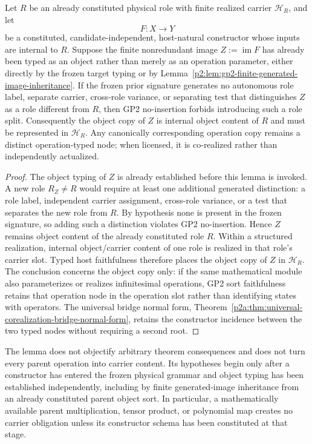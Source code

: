 \documentclass[12pt,a4paper]{article}
\begin{document}
\begin{lemma}
\label{p2:lem:gp2-same-role-no-splitting}
Let \(R\) be an already constituted physical role with finite realized carrier
\(\mathcal H_R\), and let
\[
 F:X\longrightarrow Y
\]
be a constituted, candidate-independent, host-natural constructor whose inputs
are internal to \(R\).  Suppose the finite nonredundant image \(Z:=\operatorname{im}F\) has
already been typed as an object rather than merely as an operation parameter,
either directly by the frozen target typing or by
Lemma~\ref{p2:lem:gp2-finite-generated-image-inheritance}.  If the frozen prior
signature generates no autonomous role label, separate carrier, cross-role
variance, or separating test that distinguishes \(Z\) as a role different
from \(R\), then GP2 no-insertion forbids introducing such a role split.
Consequently the object copy of \(Z\) is internal object content of \(R\) and
must be represented in \(\mathcal H_R\).  Any canonically corresponding
operation copy remains a distinct operation-typed node; when licensed, it is
co-realized rather than independently actualized.
\end{lemma}

\begin{proof}
The object typing of \(Z\) is already established before this lemma is
invoked.  A new role \(R_Z\neq R\) would require at least one additional
generated distinction:
a role label, independent carrier assignment, cross-role variance, or a test
that separates the new role from \(R\).  By hypothesis none is present in the
frozen signature, so adding such a distinction violates GP2 no-insertion.
Hence \(Z\) remains object content of the already constituted role \(R\).
Within a structured realization, internal object/carrier content of one role
is realized in that role's carrier slot.  Typed host faithfulness therefore
places the object copy of \(Z\) in \(\mathcal H_R\).  The conclusion concerns
the object copy only: if the same mathematical module also parameterizes or
realizes infinitesimal operations, GP2 sort faithfulness retains that
operation node in the operation slot rather than identifying states with
operators.  The universal bridge normal form,
Theorem~\ref{p2a:thm:universal-corealization-bridge-normal-form}, retains the
constructor incidence between the two typed nodes without requiring a second
root.
\end{proof}

\begin{remark}
\label{p2:rem:gp2-same-role-no-splitting-scope}
The lemma does not objectify arbitrary theorem consequences and does not turn
every parent operation into carrier content.  Its hypotheses begin only after
a constructor has entered the frozen physical grammar and object typing has
been established independently, including by finite generated-image
inheritance from an already constituted parent object sort.  In
particular, a mathematically available parent multiplication, tensor product,
or polynomial map creates no carrier obligation unless its constructor schema
has been constituted at that stage.
\end{remark}
\end{document}
